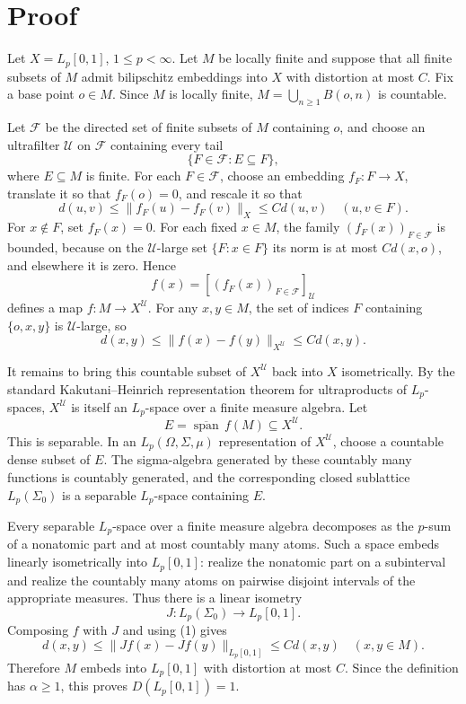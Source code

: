 \documentclass[11pt]{article}
\newcommand{\U}{\mathcal U}
\begin{document}
\section*{Proof}

Let \(X=L_p[0,1]\), \(1\le p<\infty\).  Let \(M\) be locally finite and suppose
that all finite subsets of \(M\) admit bilipschitz embeddings into \(X\) with
distortion at most \(C\).  Fix a base point \(o\in M\).  Since \(M\) is locally
finite, \(M=\bigcup_{n\ge 1} B(o,n)\) is countable.

Let \(\mathcal F\) be the directed set of finite subsets of \(M\) containing
\(o\), and choose an ultrafilter \(\U\) on \(\mathcal F\) containing every tail
\[
  \{F\in\mathcal F: E\subseteq F\},
\]
where \(E\subseteq M\) is finite.  For each \(F\in\mathcal F\), choose an
embedding \(f_F:F\to X\), translate it so that \(f_F(o)=0\), and rescale it so
that
\[
  d(u,v)\le \|f_F(u)-f_F(v)\|_X \le C d(u,v)
  \quad (u,v\in F).
\]
For \(x\notin F\), set \(f_F(x)=0\).  For each fixed \(x\in M\), the family
\((f_F(x))_{F\in\mathcal F}\) is bounded, because on the \(\U\)-large set
\(\{F:x\in F\}\) its norm is at most \(C d(x,o)\), and elsewhere it is zero.
Hence
\[
  f(x)=[(f_F(x))_{F\in\mathcal F}]_{\U}
\]
defines a map \(f:M\to X^\U\).  For any \(x,y\in M\), the set of indices
\(F\) containing \(\{o,x,y\}\) is \(\U\)-large, so
\[
  d(x,y)\le \|f(x)-f(y)\|_{X^\U}\le C d(x,y).        \tag{1}
\]

It remains to bring this countable subset of \(X^\U\) back into \(X\)
isometrically.  By the standard Kakutani--Heinrich representation theorem for
ultraproducts of \(L_p\)-spaces, \(X^\U\) is itself an \(L_p\)-space over a
finite measure algebra.  Let
\[
  E=\overline{\operatorname{span}}\, f(M)\subseteq X^\U .
\]
This is separable.  In an \(L_p(\Omega,\Sigma,\mu)\) representation of
\(X^\U\), choose a countable dense subset of \(E\).  The sigma-algebra
generated by these countably many functions is countably generated, and the
corresponding closed sublattice \(L_p(\Sigma_0)\) is a separable \(L_p\)-space
containing \(E\).

Every separable \(L_p\)-space over a finite measure algebra decomposes as the
\(p\)-sum of a nonatomic part and at most countably many atoms.  Such a space
embeds linearly isometrically into \(L_p[0,1]\): realize the nonatomic part on
a subinterval and realize the countably many atoms on pairwise disjoint
intervals of the appropriate measures.  Thus there is a linear isometry
\[
  J:L_p(\Sigma_0)\longrightarrow L_p[0,1].
\]
Composing \(f\) with \(J\) and using (1) gives
\[
  d(x,y)\le \|Jf(x)-Jf(y)\|_{L_p[0,1]}\le C d(x,y)
  \quad (x,y\in M).
\]
Therefore \(M\) embeds into \(L_p[0,1]\) with distortion at most \(C\).  Since
the definition has \(\alpha\ge 1\), this proves \(D(L_p[0,1])=1\).
\end{document}
